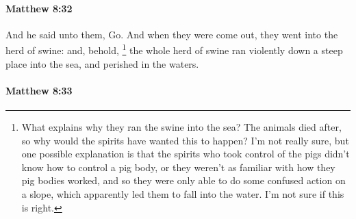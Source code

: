 		\paragraph{Matthew 8:32} %
			\label{MATTHEW-8-32}

			And he said unto them, Go. And when they were come out, they went into the herd of swine: and, behold,
				\footnote{%
					What explains why they ran the swine into the sea? The animals died after, so why would the spirits have wanted this to happen? I'm not really sure, but one possible explanation is that the spirits who took control of the pigs didn't know how to control a pig body, or they weren't as familiar with how they pig bodies worked, and so they were only able to do some confused action on a slope, which apparently led them to fall into the water. I'm not sure if this is right.
					}%
			the whole herd of swine ran violently down a steep place into the sea, and perished in the waters.

			\begin{framed}
			\scriptsize
				\begin{compactdesc}
					\item[SBLG] 
				\end{compactdesc}
			\end{framed}

		\paragraph{Matthew 8:33} %
			\label{MATTHEW-8-33}

